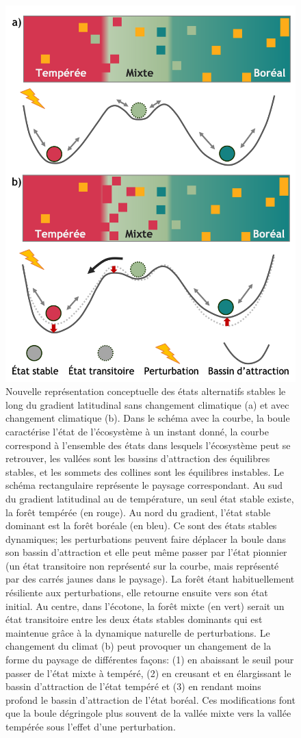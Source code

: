 \newpage

\begin{figure}
\centering
\includegraphics[width=.63\textwidth]{conclusion/figures/etat_alternatif2.png}
\caption[Représentation conceptuelle des états alternatifs stables le long du gradient latitudinal]{Nouvelle représentation conceptuelle des états alternatifs stables le long du gradient latitudinal sans changement climatique (a) et avec changement climatique (b). Dans le schéma avec la courbe, la boule caractérise l'état de l'écosystème à un instant donné, la courbe correspond à l'ensemble des états dans lesquels l’écosystème peut se retrouver, les vallées sont les bassins d'attraction des équilibres stables, et les sommets des collines sont les équilibres instables. Le schéma rectangulaire représente le paysage correspondant. Au sud du gradient latitudinal au de température, un seul état stable existe, la forêt tempérée (en rouge). Au nord du gradient, l'état stable dominant est la forêt boréale (en bleu). Ce sont des états stables dynamiques; les perturbations peuvent faire déplacer la boule dans son bassin d'attraction et elle peut même passer par l'état pionnier (un état transitoire non représenté sur la courbe, mais représenté par des carrés jaunes dans le paysage). La forêt étant habituellement résiliente aux perturbations, elle retourne ensuite vers son état initial. Au centre, dans l'écotone, la forêt mixte (en vert) serait un état transitoire entre les deux états stables dominants qui est maintenue grâce à la dynamique naturelle de perturbations. Le changement du climat (b) peut provoquer un changement de la forme du paysage de différentes façons: (1) en abaissant le seuil pour passer de l'état mixte à tempéré, (2) en creusant et en élargissant le bassin d'attraction de l'état tempéré et (3) en rendant moins profond le bassin d'attraction de l'état boréal. Ces modifications font que la boule dégringole plus souvent de la vallée mixte vers la vallée tempérée sous l'effet d'une perturbation.}
\label{fig4.1}
\end{figure}

